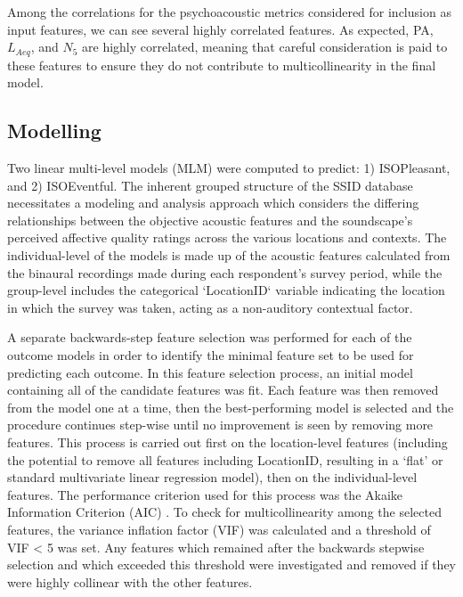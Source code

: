 Among the correlations for the psychoacoustic metrics considered for inclusion as input features, we can see several highly correlated features. As expected, PA, $L_{Aeq}$, and $N_5$ are highly correlated, meaning that careful consideration is paid to these features to ensure they do not contribute to multicollinearity in the final model.

\subsection{Modelling}

Two linear multi-level models (MLM) were computed to predict: 1) ISOPleasant, and 2) ISOEventful. The inherent grouped structure of the SSID database necessitates a modeling and analysis approach which considers the differing relationships between the objective acoustic features and the soundscape’s perceived affective quality ratings across the various locations and contexts. The individual-level of the models is made up of the acoustic features calculated from the binaural recordings made during each respondent’s survey period, while the group-level includes the categorical `LocationID` variable indicating the location in which the survey was taken, acting as a non-auditory contextual factor. 

A separate backwards-step feature selection was performed for each of the outcome models in order to identify the minimal feature set to be used for predicting each outcome. In this feature selection process, an initial model containing all of the candidate features was fit. Each feature was then removed from the model one at a time, then the best-performing model is selected and the procedure continues step-wise until no improvement is seen by removing more features. This process is carried out first on the location-level features (including the potential to remove all features including LocationID, resulting in a ‘flat’ or standard multivariate linear regression model), then on the individual-level features. The performance criterion used for this process was the Akaike Information Criterion (AIC) \citep{akaike_hirotugu_new_1974}. To check for multicollinearity among the selected features, the variance inflation factor (VIF) was calculated and a threshold of VIF \textless{ 5} was set. Any features which remained after the backwards stepwise selection and which exceeded this threshold were investigated and removed if they were highly collinear with the other features.

